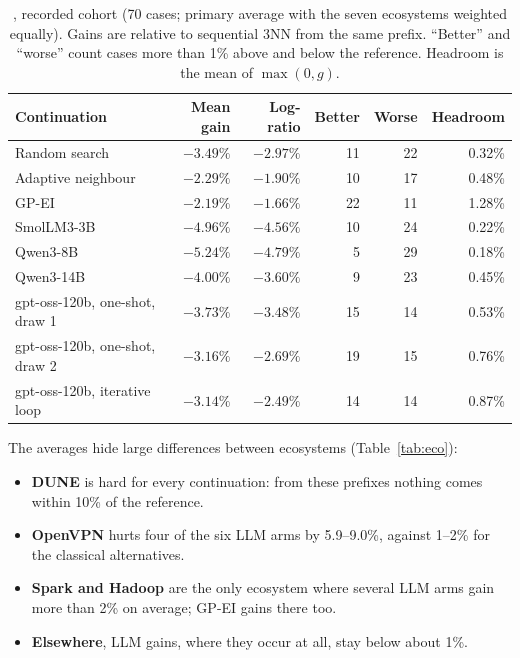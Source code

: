 \begin{table}[t]
\centering
\caption{, recorded cohort (70 cases; primary average with the seven ecosystems weighted equally). Gains are relative to sequential 3NN from the same prefix. ``Better'' and ``worse'' count cases more than 1\% above and below the reference. Headroom is the mean of $\max(0,g)$.}
\label{tab:rq1}
\small
\begin{tabular}{lrrrrr}
\toprule
Continuation & Mean gain & Log-ratio & Better & Worse & Headroom \\
\midrule
Random search & $-3.49\%$ & $-2.97\%$ & 11 & 22 & 0.32\% \\
Adaptive neighbour & $-2.29\%$ & $-1.90\%$ & 10 & 17 & 0.48\% \\
GP-EI & $-2.19\%$ & $-1.66\%$ & 22 & 11 & 1.28\% \\
\midrule
SmolLM3-3B & $-4.96\%$ & $-4.56\%$ & 10 & 24 & 0.22\% \\
Qwen3-8B & $-5.24\%$ & $-4.79\%$ & 5 & 29 & 0.18\% \\
Qwen3-14B & $-4.00\%$ & $-3.60\%$ & 9 & 23 & 0.45\% \\
gpt-oss-120b, one-shot, draw 1 & $-3.73\%$ & $-3.48\%$ & 15 & 14 & 0.53\% \\
gpt-oss-120b, one-shot, draw 2 & $-3.16\%$ & $-2.69\%$ & 19 & 15 & 0.76\% \\
gpt-oss-120b, iterative loop & $-3.14\%$ & $-2.49\%$ & 14 & 14 & 0.87\% \\
\bottomrule
\end{tabular}
\end{table}

The averages hide large differences between ecosystems (Table~\ref{tab:eco}):
\begin{itemize}
  \item \textbf{DUNE} is hard for every continuation: from these prefixes nothing comes within 10\% of the reference.
  \item \textbf{OpenVPN} hurts four of the six LLM arms by 5.9--9.0\%, against 1--2\% for the classical alternatives.
  \item \textbf{Spark and Hadoop} are the only ecosystem where several LLM arms gain more than 2\% on average; GP-EI gains there too.
  \item \textbf{Elsewhere}, LLM gains, where they occur at all, stay below about 1\%.
\end{itemize}

